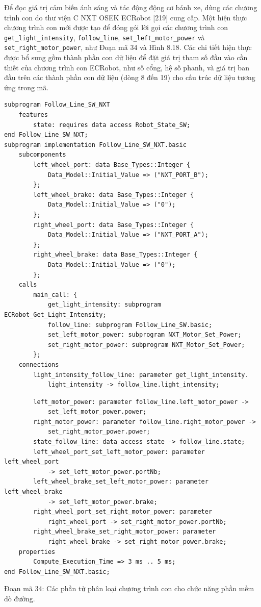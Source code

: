 Để đọc giá trị cảm biến ánh sáng và tác động động cơ bánh xe, dùng các chương trình con do thư viện C NXT OSEK ECRobot [219] cung cấp. Một hiện thực chương trình con mới được tạo để đóng gói lời gọi các chương trình con \texttt{get\_light\_intensity}, \texttt{follow\_line}, \texttt{set\_left\_motor\_power} và \texttt{set\_right\_motor\_power}, như Đoạn mã 34 và Hình 8.18. Các chi tiết hiện thực được bổ sung gồm thành phần con dữ liệu để đặt giá trị tham số đầu vào cần thiết của chương trình con ECRobot, như số cổng, hệ số phanh, và giá trị ban đầu trên các thành phần con dữ liệu (dòng 8 đến 19) cho cấu trúc dữ liệu tương ứng trong mã.
\begin{verbatim}
subprogram Follow_Line_SW_NXT
    features
        state: requires data access Robot_State_SW;
end Follow_Line_SW_NXT;
subprogram implementation Follow_Line_SW_NXT.basic
    subcomponents
        left_wheel_port: data Base_Types::Integer {
            Data_Model::Initial_Value => ("NXT_PORT_B");
        };
        left_wheel_brake: data Base_Types::Integer {
            Data_Model::Initial_Value => ("0");
        };
        right_wheel_port: data Base_Types::Integer {
            Data_Model::Initial_Value => ("NXT_PORT_A");
        };
        right_wheel_brake: data Base_Types::Integer {
            Data_Model::Initial_Value => ("0");
        };
    calls
        main_call: {
            get_light_intensity: subprogram ECRobot_Get_Light_Intensity;
            follow_line: subprogram Follow_Line_SW.basic;
            set_left_motor_power: subprogram NXT_Motor_Set_Power;
            set_right_motor_power: subprogram NXT_Motor_Set_Power;
        };
    connections
        light_intensity_follow_line: parameter get_light_intensity.
            light_intensity -> follow_line.light_intensity;
\end{verbatim}
\begin{verbatim}
        left_motor_power: parameter follow_line.left_motor_power ->
            set_left_motor_power.power;
        right_motor_power: parameter follow_line.right_motor_power ->
            set_right_motor_power.power;
        state_follow_line: data access state -> follow_line.state;
        left_wheel_port_set_left_motor_power: parameter left_wheel_port
            -> set_left_motor_power.portNb;
        left_wheel_brake_set_left_motor_power: parameter left_wheel_brake
            -> set_left_motor_power.brake;
        right_wheel_port_set_right_motor_power: parameter
            right_wheel_port -> set_right_motor_power.portNb;
        right_wheel_brake_set_right_motor_power: parameter
            right_wheel_brake -> set_right_motor_power.brake;
    properties
        Compute_Execution_Time => 3 ms .. 5 ms;
end Follow_Line_SW_NXT.basic;
\end{verbatim}
\begin{center}\small Đoạn mã 34: Các phần tử phân loại chương trình con cho chức năng phần mềm dò đường.\end{center}

